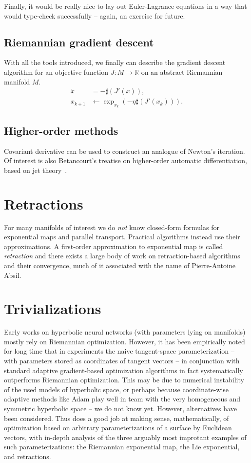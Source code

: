 Finally, it would be really nice to lay out Euler-Lagrance equations in a way
that would type-check successfully -- again, an exercise for future.

\subsection*{Riemannian gradient descent}

With all the tools introduced, we finally can describe the gradient descent
algorithm for an objective function \( J: M \to \mathbb{R} \) on an abstract
Riemannian manifold \( M \).
\begin{align*}
\dot x &= -\sharp(J'(x)),\\
x_{k+1} &\leftarrow \exp_{x_k}(-\eta \sharp(J'(x_k))).
\end{align*}

\subsection*{Higher-order methods}

Covariant derivative can be used to construct an analogue of Newton's
iteration. Of interest is also Betancourt's treatise on higher-order automatic
differentiation, based on jet theory~\cite{betancourt2018geometric}.

\section*{Retractions}

For many manifolds of interest we do \emph{not} know closed-form formulas for
exponential maps and parallel transport. Practical algorithms instead use their
approximations. A first-order approximation to exponential map is called
\emph{retraction} and there exists a large body of work on retraction-based
algorithms and their convergence, much of it associated with the name of
Pierre-Antoine Absil.

\section*{Trivializations}

Early works on hyperbolic neural networks (with parameters lying on manifolds)
mostly rely on Riemannian optimization. However, it has been empirically noted
for long time that in experiments the naive tangent-space parameterization --
with parameters stored as coordinates of tangent vectors -- in conjunction with
standard adaptive gradient-based optimization algorithms in fact systematically
outperforms Riemannian optimization. This may be due to numerical instability
of the used models of hyperbolic space, or perhaps because coordinate-wise
adaptive methods like Adam play well in team with the very homogeneous and
symmetric hyperbolic space -- we do not know yet. However, alternatives have
been considered. Thus \citet{trivializations} does a good job at making sense,
mathematically, of optimization based on arbitrary parameterizations of a
surface by Euclidean vectors, with in-depth analysis of the three arguably most
improtant examples of such parameterizations: the Riemannian exponential map,
the Lie exponential, and retractions.

